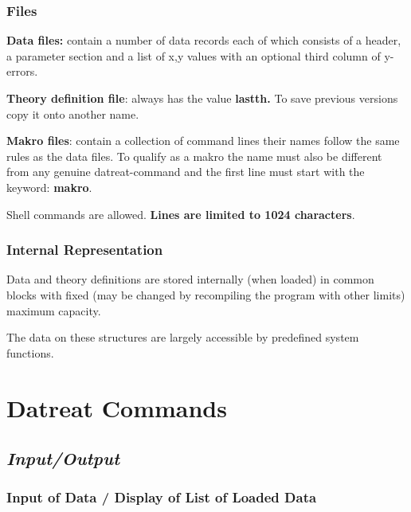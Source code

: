 \documentclass[]{article}
\begin{document}
\hypertarget{files}{%
\subsubsection{Files}\label{files}}

\textbf{Data files:} contain a number of data records each of which
consists of a header, a parameter section and a list of x,y values with
an optional third column of y-errors.

\textbf{Theory definition file}: always has the value \textbf{lastth.}
To save previous versions copy it onto another name.

\textbf{Makro files}: contain a collection of command lines their names
follow the same rules as the data files. To qualify as a makro the name
must also be different from any genuine datreat-command and the first
line must start with the keyword: \textbf{makro}.

Shell commands are allowed. \textbf{Lines are limited to 1024
characters}.

\hypertarget{internal-representation}{%
\subsubsection{Internal Representation}\label{internal-representation}}

Data and theory definitions are stored internally (when loaded) in
common blocks with fixed (may be changed by recompiling the program with
other limits) maximum capacity.

The data on these structures are largely accessible by predefined system
functions.

\hypertarget{datreat-commands}{%
\section{Datreat Commands}\label{datreat-commands}}

\hypertarget{inputoutput}{%
\subsection{\texorpdfstring{\emph{Input/Output
}}{Input/Output }}\label{inputoutput}}

\hypertarget{input-of-data-display-of-list-of-loaded-data}{%
\subsubsection{Input of Data / Display of List of Loaded
Data}\label{input-of-data-display-of-list-of-loaded-data}}
\end{document}
